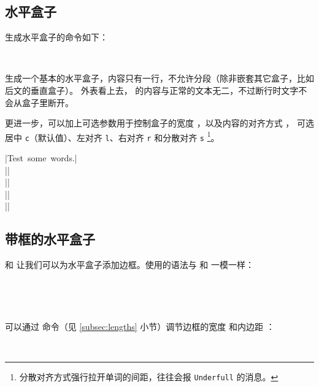 \subsection{水平盒子}\label{subsec:mbox}

生成水平盒子的命令如下：
\begin{command}
\marg*{\ldots} \\
\marg*{\ldots}
\end{command}

 生成一个基本的水平盒子，内容只有一行，不允许分段（除非嵌套其它盒子，比如后文的垂直盒子）。
外表看上去， 的内容与正常的文本无二，不过断行时文字不会从盒子里断开。

 更进一步，可以加上可选参数用于控制盒子的宽度 ，以及内容的对齐方式 ，
可选居中 \texttt{c}（默认值）、左对齐 \texttt{l}、右对齐 \texttt{r} 和分散对齐 \texttt{s}%
\footnote{分散对齐方式强行拉开单词的间距，往往会报 \texttt{Underfull}  的消息。}。
\begin{example}
|\mbox{Test some words.}|\\
||\\
||\\
||\\
||
\end{example}

\subsection{带框的水平盒子}\label{subsec:fbox}

 和  让我们可以为水平盒子添加边框。使用的语法与  和  一模一样：
\begin{command}
\marg*{\ldots} \\
\marg*{\ldots}
\end{command}
\begin{example}
\\
\end{example}

可以通过  命令（见 \ref{subsec:lengths} 小节）调节边框的宽度  和内边距 ：
\begin{example}
\\[1ex]
\setlength{\fboxrule}{1.6pt}
\setlength{\fboxsep}{1em}
\end{example}

